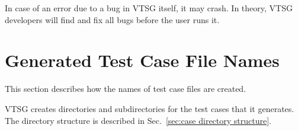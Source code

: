 \documentclass[12pt]{article}
\begin{document}
In case of an error due to a bug in VTSG itself, it may crash.  In theory, VTSG
developers will find and fix all bugs before the user runs it.


\section{Generated Test Case File Names}

This section describes how the names of test case files are created.

VTSG creates directories and subdirectories for the test cases that it generates.
The directory structure is described in
Sec.~\ref{sec:case directory structure}.

\label{sec:case file name}
\end{document}
